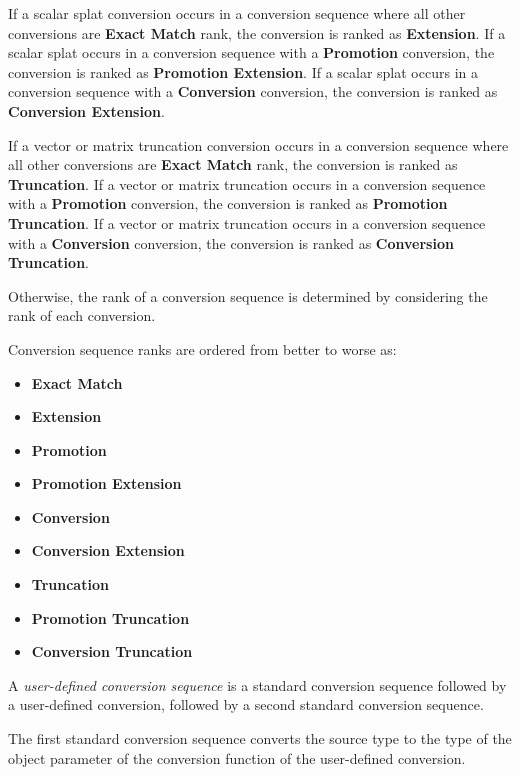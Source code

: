 \p If a scalar splat conversion occurs in a conversion sequence where all other
conversions are \textbf{Exact Match} rank, the conversion is ranked as
\textbf{Extension}. If a scalar splat occurs in a conversion
sequence with a \textbf{Promotion} conversion, the conversion is ranked as
\textbf{Promotion Extension}. If a scalar splat occurs in a conversion
sequence with a \textbf{Conversion} conversion, the conversion is ranked as
\textbf{Conversion Extension}.

\p If a vector or matrix truncation conversion occurs in a conversion sequence where all
other conversions are \textbf{Exact Match} rank, the conversion is ranked as
\textbf{Truncation}. If a vector or matrix truncation occurs in a conversion
sequence with a \textbf{Promotion} conversion, the conversion is ranked as
\textbf{Promotion Truncation}. If a vector or matrix truncation occurs in a conversion
sequence with a \textbf{Conversion} conversion, the conversion is ranked as
\textbf{Conversion Truncation}.

\p Otherwise, the rank of a conversion sequence is determined by considering the
rank of each conversion.

\p Conversion sequence ranks are ordered from better to worse as:

\begin{itemize}
  \item \textbf{Exact Match}
  \item \textbf{Extension}
  \item \textbf{Promotion}
  \item \textbf{Promotion Extension}
  \item \textbf{Conversion}
  \item \textbf{Conversion Extension}
  \item \textbf{Truncation}
  \item \textbf{Promotion Truncation}
  \item \textbf{Conversion Truncation}
\end{itemize}


\p A \textit{user-defined conversion sequence} is a standard conversion sequence
followed by a user-defined conversion, followed by a second standard conversion
sequence.

\p The first standard conversion sequence converts the source type to the
type of the object parameter of the conversion function of the user-defined
conversion.

